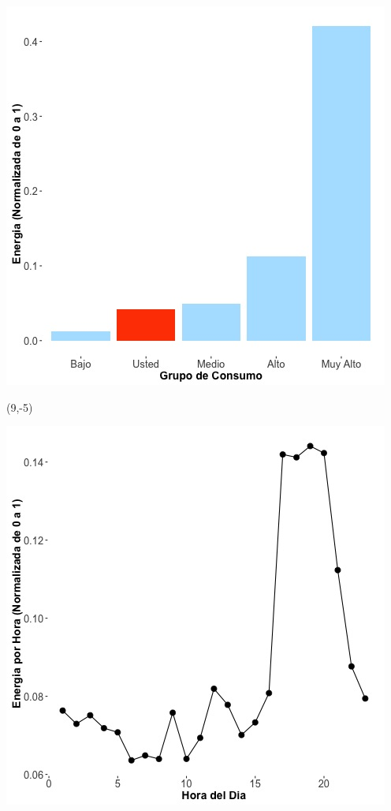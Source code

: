 \documentclass{article}\usepackage[]{graphicx}\usepackage[]{color}
\newenvironment{knitrout}{}{} %
\begin{document}
\begin{knitrout}
\color{fgcolor}
\includegraphics[scale=0.65]{figure/A7_neighbor_plot} 
\end{knitrout}

 \begin{textblock}{1}(9,-5)
\begin{minipage}{20em}
\begingroup

\endgroup
\end{minipage}
\end{textblock}

\begin{knitrout}
\color{fgcolor}
\includegraphics[scale=0.65]{figure/A7_plot_norm_median} 
\end{knitrout}
\end{document}
